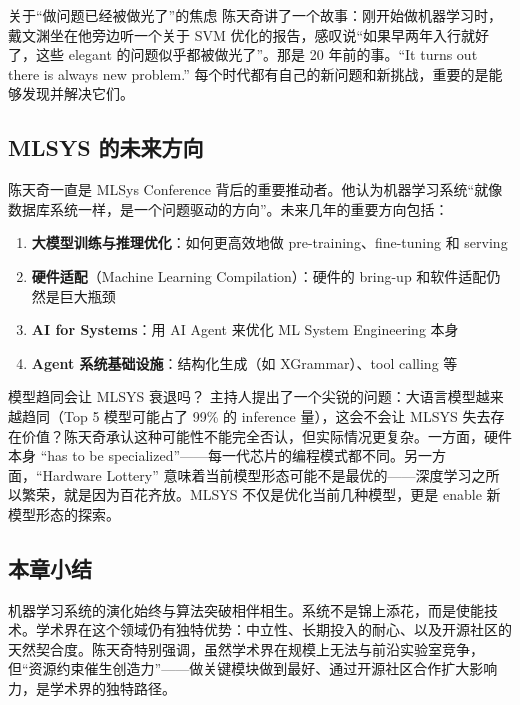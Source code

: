 \begin{warningbox}{关于``做问题已经被做光了''的焦虑}
陈天奇讲了一个故事：刚开始做机器学习时，戴文渊坐在他旁边听一个关于 SVM 优化的报告，感叹说``如果早两年入行就好了，这些 elegant 的问题似乎都被做光了''。那是 20 年前的事。``It turns out there is always new problem.'' 每个时代都有自己的新问题和新挑战，重要的是能够发现并解决它们。
\end{warningbox}

\subsection{MLSYS 的未来方向}

陈天奇一直是 MLSys Conference 背后的重要推动者。他认为机器学习系统``就像数据库系统一样，是一个问题驱动的方向''。未来几年的重要方向包括：

\begin{enumerate}
    \item \textbf{大模型训练与推理优化}：如何更高效地做 pre-training、fine-tuning 和 serving
    \item \textbf{硬件适配}（Machine Learning Compilation）：硬件的 bring-up 和软件适配仍然是巨大瓶颈
    \item \textbf{AI for Systems}：用 AI Agent 来优化 ML System Engineering 本身
    \item \textbf{Agent 系统基础设施}：结构化生成（如 XGrammar）、tool calling 等
\end{enumerate}

\begin{knowledgebox}{模型趋同会让 MLSYS 衰退吗？}
主持人提出了一个尖锐的问题：大语言模型越来越趋同（Top 5 模型可能占了 99\% 的 inference 量），这会不会让 MLSYS 失去存在价值？陈天奇承认这种可能性不能完全否认，但实际情况更复杂。一方面，硬件本身 ``has to be specialized''------每一代芯片的编程模式都不同。另一方面，``Hardware Lottery'' 意味着当前模型形态可能不是最优的------深度学习之所以繁荣，就是因为百花齐放。MLSYS 不仅是优化当前几种模型，更是 enable 新模型形态的探索。
\end{knowledgebox}

\subsection{本章小结}

机器学习系统的演化始终与算法突破相伴相生。系统不是锦上添花，而是使能技术。学术界在这个领域仍有独特优势：中立性、长期投入的耐心、以及开源社区的天然契合度。陈天奇特别强调，虽然学术界在规模上无法与前沿实验室竞争，但``资源约束催生创造力''------做关键模块做到最好、通过开源社区合作扩大影响力，是学术界的独特路径。

